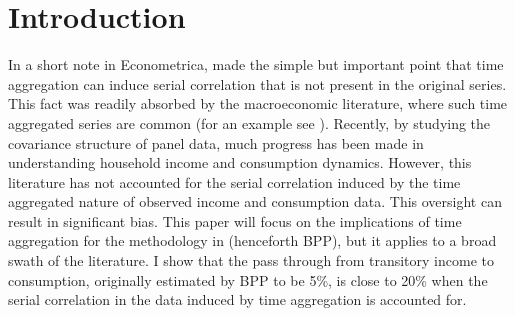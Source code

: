 \documentclass[titlepage]{\econtex}\newcommand{\texname}{BPP_TimeAgg}
\begin{document}
\section{Introduction}
In a short note in Econometrica, \cite{working_note_1960} made the simple but important point that time aggregation can induce serial correlation that is not present in the original series. This fact was readily absorbed by the macroeconomic literature, where such time aggregated series are common (for an example see \cite{campbell_consumption_1989}). Recently, by studying the covariance structure of panel data, much progress has been made in understanding household income and consumption dynamics. However, this literature has not accounted for the serial correlation induced by the time aggregated nature of observed income and consumption data. This oversight can result in significant bias. This paper will focus on the implications of time aggregation for the methodology in \cite{blundell_consumption_2008} (henceforth BPP), but it applies to a broad swath of the literature. I show that the pass through from transitory income to consumption, originally estimated by BPP to be 5\%, is close to 20\% when the serial correlation in the data induced by time aggregation is accounted for.
\end{document}
